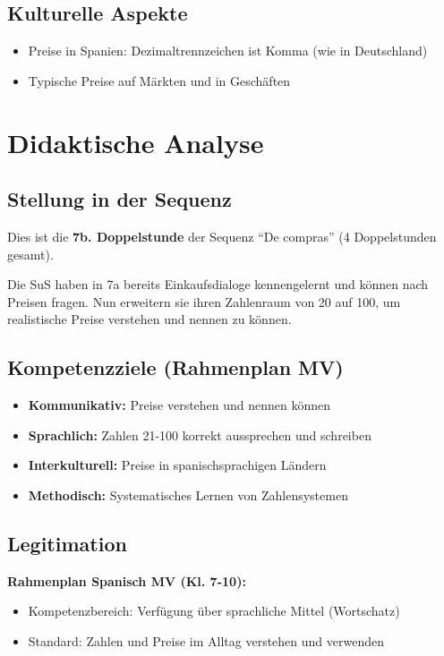 \documentclass[11pt,a4paper]{article}
\newcommand{\reihenthema}{De compras}
\newcommand{\reihenstunden}{4}
\begin{document}
\subsection{Kulturelle Aspekte}
\begin{itemize}
    \item Preise in Spanien: Dezimaltrennzeichen ist Komma (wie in Deutschland)
    \item Typische Preise auf Märkten und in Geschäften
\end{itemize}

\section{Didaktische Analyse}

\subsection{Stellung in der Sequenz}
Dies ist die \textbf{7b. Doppelstunde} der Sequenz ``\reihenthema'' (\reihenstunden{} Doppelstunden gesamt).

Die SuS haben in 7a bereits Einkaufsdialoge kennengelernt und können nach Preisen fragen. Nun erweitern sie ihren Zahlenraum von 20 auf 100, um realistische Preise verstehen und nennen zu können.

\subsection{Kompetenzziele (Rahmenplan MV)}
\begin{itemize}
    \item \textbf{Kommunikativ:} Preise verstehen und nennen können
    \item \textbf{Sprachlich:} Zahlen 21-100 korrekt aussprechen und schreiben
    \item \textbf{Interkulturell:} Preise in spanischsprachigen Ländern
    \item \textbf{Methodisch:} Systematisches Lernen von Zahlensystemen
\end{itemize}

\subsection{Legitimation}
\textbf{Rahmenplan Spanisch MV (Kl. 7-10):}
\begin{itemize}
    \item Kompetenzbereich: Verfügung über sprachliche Mittel (Wortschatz)
    \item Standard: Zahlen und Preise im Alltag verstehen und verwenden
\end{itemize}
\end{document}
